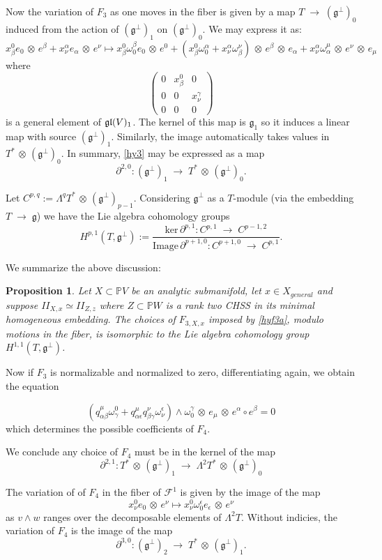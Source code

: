 \documentclass[11pt]{amsart}
\newtheorem{proposition}[theorem]{Proposition}
\theoremstyle{definition}
\theoremstyle{remark}
\numberwithin{equation}{section}
\def\ooo#1#2{\omega^{#1}_{#2}}\def\xxx#1#2{x^{#1}_{#2}}
\def\oo#1{\omega^{#1}_0}
\def\ep{\epsilon}
\def\qq#1#2#3{q^{#1}_{{#2} {#3}}}
\def\cf{\mathcal F}
\def\BP{\mathbb P}
\def\ww{\wedge}
\def\upperp{{}^\perp}
\def\fg{{\mathfrak g}}
\def\a{\alpha}
\def\b{\beta}
\def\g{\gamma}
\def\ot{{\mathord{\,\otimes }\,}}
\def\ra{{\mathord{\;\rightarrow\;}}}
\def\La#1{\Lambda^{#1}}
\def\tim{\text{Image}\,}
\def\tker{\text{ker}\,}
\begin{document}
Now the variation of $F_3$ as one moves in the fiber is given by
a map $T\ra (\fg\upperp)_0$ induced from the action of
$(\fg\upperp)_1$ on $ (\fg\upperp)_0$. We may express it as:
\begin{equation}\label{hy3}
\xxx 0\b e_0\ot e^{\b} + \xxx\a\nu e_{\a}\ot e^{\nu}
\mapsto 
\xxx 0\b\oo\b e_0\ot e^0+(\xxx 0\b\oo\a +\xxx\a\nu\ooo\nu\b)\ot e^{\b}\ot e_{\a}
+\xxx\a\nu\ooo\mu\a\ot e^{\nu}\ot e_{\mu}
\end{equation}
where 
$$
\begin{pmatrix}
0&\xxx 0\b &0\\ 0&0 &\xxx\g\nu \\ 0&0&0
\end{pmatrix}
$$
is a general element of $\mathfrak g\mathfrak l(V)_1$. 
The kernel of this map is    $\fg_1$ 
so it induces a linear map with source $(\fg\upperp)_1$. Similarly, the image automatically
takes values in $T^*\ot (\fg\upperp)_0$.
In summary, \eqref{hy3} may be expressed as a map
$$\partial^{2,0}: (\fg\upperp)_1\ra T^*\ot (\fg\upperp)_0.
$$
 

Let $C^{p,q}:=\La q T^*\ot (\fg\upperp)_{p-1}$. Considering $\fg\upperp$ as
a $T$-module (via the embedding $T \ra \fg$) we have the Lie algebra
cohomology groups
$$H^{p,1}(T, \fg\upperp):=
\frac{\tker \partial^{p,1}: C^{p,1}\ra C^{p-1,2}}
{\tim \partial^{p+1,0}: C^{p+1,0}\ra C^{p,1}}.
$$



 We summarize the above discussion:

\begin{proposition}
Let $X\subset \BP V$ be an analytic submanifold, let $x\in X_{general}$ and
suppose $II_{X,x}\simeq II_{Z,z}$ where $Z\subset \BP W$ is a
rank two CHSS in its
minimal homogeneous embedding.
The choices of $F_{3,X,x}$  imposed by \eqref{hyf3a}, modulo motions in the fiber, is isomorphic to the
Lie algebra cohomology group
$
H^{1,1}(T,\fg\upperp)
$.
\end{proposition}

Now if $F_3$ is normalizable and normalized to zero,
differentiating  again, we obtain
the equation

$$
(\qq\mu\a\b\ooo 0\g +\qq\mu\a\ep\qq\nu\b\g\ooo\ep\nu)\ww\oo\g
\ot e_{\mu}\ot e^{\a}\circ e^{\b}=0
$$
which determines the possible coefficients of $F_4$.

We conclude any choice of $F_4$ must be in the kernel of the map
$$
\partial^{2,1}: T^*\ot (\fg\upperp)_1\ra \La 2T^*\ot (\fg\upperp)_0
$$

The variation of  of $F_4$ in the fiber of $\cf^1$ is given by the image of the map
$$
\xxx 0\nu e_0\ot e^{\nu} \mapsto \xxx 0\nu\oo\ep e_{\ep}\ot e^{\nu}
$$
as $v\ww w$ ranges over the decomposable elements of $\La 2 T$. 
Without indicies, the variation of $F_4$ is the image of the map
$$
\partial^{3,0}: (\fg\upperp)_2\ra  T^*\ot (\fg\upperp)_1.
$$
\end{document}
